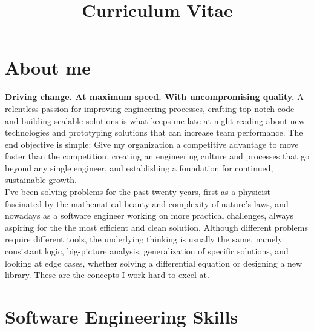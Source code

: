 \documentclass[11pt,a4paper,sans]{moderncv}        %
\title{Curriculum Vitae}                               %
\begin{document}
\makecvtitle

\section{About me}

  \textbf{Driving change. At maximum speed. With uncompromising quality.} A relentless passion for improving engineering processes, crafting top-notch code and building scalable solutions is
  what keeps me late at night reading about new technologies and prototyping solutions that can increase team performance. The end objective is simple: Give my organization a competitive advantage to move
  faster than the competition, creating an engineering culture and processes that go beyond any single engineer, and establishing a foundation for continued, sustainable growth. \\

  I've been solving problems for the past twenty years, first as a physicist fascinated by the mathematical beauty and complexity of nature's laws, and nowadays as a software
  engineer working on more practical challenges, always aspiring for the the most efficient and clean solution. Although different problems require different tools, the underlying thinking
  is usually the same, namely consistant logic, big-picture analysis, generalization of specific solutions, and looking at edge cases, whether solving a
  differential equation or designing a new library. These are the concepts I work hard to excel at.

\nopagebreak[4]

\section{Software Engineering Skills}


\end{document}
